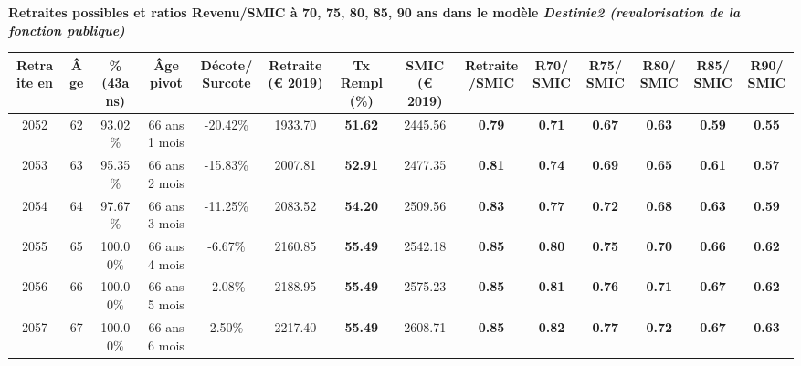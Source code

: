  \vspace{0.1cm} 
{\bf \noindent Retraites possibles et ratios Revenu/SMIC à 70, 75, 80, 85, 90 ans dans le modèle \emph{Destinie2 (revalorisation de la fonction publique)}}  
 
\begin{adjustbox}{max width=\textwidth} 
\begin{tabular}[htb]{|c|c||c|c|c||c|c||c|c||c|c|c|c|c|} 
\hline 
 Retraite en &  Âge &  \%(43ans) &  Âge pivot &  Décote/Surcote &  Retraite (\euro{} 2019) &  Tx Rempl(\%) &  SMIC (\euro{} 2019) &  Retraite/SMIC &  R70/SMIC &  R75/SMIC &  R80/SMIC &  R85/SMIC &  R90/SMIC \\ 
\hline \hline 
 2052 &  62 &  93.02\% &  66 ans 1 mois &  -20.42\% &  1933.70 &  {\bf 51.62} &  2445.56 &  {\bf {\color{red} 0.79}} &  {\bf {\color{red} 0.71}} &  {\bf {\color{red} 0.67}} &  {\bf {\color{red} 0.63}} &  {\bf {\color{red} 0.59}} &  {\bf {\color{red} 0.55}} \\ 
\hline 
 2053 &  63 &  95.35\% &  66 ans 2 mois &  -15.83\% &  2007.81 &  {\bf 52.91} &  2477.35 &  {\bf {\color{red} 0.81}} &  {\bf {\color{red} 0.74}} &  {\bf {\color{red} 0.69}} &  {\bf {\color{red} 0.65}} &  {\bf {\color{red} 0.61}} &  {\bf {\color{red} 0.57}} \\ 
\hline 
 2054 &  64 &  97.67\% &  66 ans 3 mois &  -11.25\% &  2083.52 &  {\bf 54.20} &  2509.56 &  {\bf {\color{red} 0.83}} &  {\bf {\color{red} 0.77}} &  {\bf {\color{red} 0.72}} &  {\bf {\color{red} 0.68}} &  {\bf {\color{red} 0.63}} &  {\bf {\color{red} 0.59}} \\ 
\hline 
 2055 &  65 &  100.00\% &  66 ans 4 mois &  -6.67\% &  2160.85 &  {\bf 55.49} &  2542.18 &  {\bf {\color{red} 0.85}} &  {\bf {\color{red} 0.80}} &  {\bf {\color{red} 0.75}} &  {\bf {\color{red} 0.70}} &  {\bf {\color{red} 0.66}} &  {\bf {\color{red} 0.62}} \\ 
\hline 
 2056 &  66 &  100.00\% &  66 ans 5 mois &  -2.08\% &  2188.95 &  {\bf 55.49} &  2575.23 &  {\bf {\color{red} 0.85}} &  {\bf {\color{red} 0.81}} &  {\bf {\color{red} 0.76}} &  {\bf {\color{red} 0.71}} &  {\bf {\color{red} 0.67}} &  {\bf {\color{red} 0.62}} \\ 
\hline 
 2057 &  67 &  100.00\% &  66 ans 6 mois &  2.50\% &  2217.40 &  {\bf 55.49} &  2608.71 &  {\bf {\color{red} 0.85}} &  {\bf {\color{red} 0.82}} &  {\bf {\color{red} 0.77}} &  {\bf {\color{red} 0.72}} &  {\bf {\color{red} 0.67}} &  {\bf {\color{red} 0.63}} \\ 
\hline 
\hline 
\end{tabular} 
\end{adjustbox} 
 
